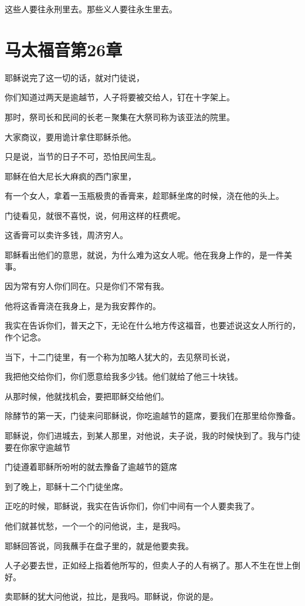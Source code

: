 \documentclass[12pt,oneside]{book}
\begin{document}
这些人要往永刑里去。那些义人要往永生里去。

\chapter{马太福音第26章}
耶稣说完了这一切的话，就对门徒说，

你们知道过两天是逾越节，人子将要被交给人，钉在十字架上。

那时，祭司长和民间的长老－聚集在大祭司称为该亚法的院里。

大家商议，要用诡计拿住耶稣杀他。

只是说，当节的日子不可，恐怕民间生乱。

耶稣在伯大尼长大麻疯的西门家里，

有一个女人，拿着一玉瓶极贵的香膏来，趁耶稣坐席的时候，浇在他的头上。

门徒看见，就很不喜悦，说，何用这样的枉费呢。

这香膏可以卖许多钱，周济穷人。

耶稣看出他们的意思，就说，为什么难为这女人呢。他在我身上作的，是一件美事。

因为常有穷人你们同在。只是你们不常有我。

他将这香膏浇在我身上，是为我安葬作的。

我实在告诉你们，普天之下，无论在什么地方传这福音，也要述说这女人所行的，作个记念。

当下，十二门徒里，有一个称为加略人犹大的，去见祭司长说，

我把他交给你们，你们愿意给我多少钱。他们就给了他三十块钱。

从那时候，他就找机会，要把耶稣交给他们。

除酵节的第一天，门徒来问耶稣说，你吃逾越节的筵席，要我们在那里给你豫备。

耶稣说，你们进城去，到某人那里，对他说，夫子说，我的时候快到了。我与门徒要在你家守逾越节

门徒遵着耶稣所吩咐的就去豫备了逾越节的筵席

到了晚上，耶稣十二个门徒坐席。

正吃的时候，耶稣说，我实在告诉你们，你们中间有一个人要卖我了。

他们就甚忧愁，一个一个的问他说，主，是我吗。

耶稣回答说，同我蘸手在盘子里的，就是他要卖我。

人子必要去世，正如经上指着他所写的，但卖人子的人有祸了。那人不生在世上倒好。

卖耶稣的犹大问他说，拉比，是我吗。耶稣说，你说的是。
\end{document}
